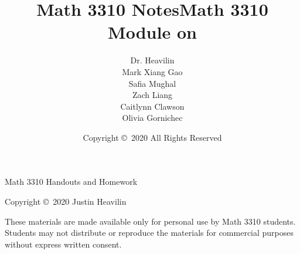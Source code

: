 \documentclass[10pt,twoside,reqno]{book}
\title{Math 3310 Notes}
\author{Dr. Heavilin\\Mark Xiang Gao\\Safia Mughal\\Zach Liang\\Caitlynn Clawson\\Olivia Gornichec\\}
\date{Copyright \copyright\ 2020  All Rights Reserved}
\title{Math 3310\\  Module on
\ifone{Sets~}\fi
\iftwo{Induction~}\fi
\ifthree{Finite Differences~}\fi
\iffour{Logic~}\fi
\iffive{Recursion~}\fi
\ifsix{Graph Theory~}\fi
\ifseven{Number Theory~}\fi
\ifeight{Groups~}\fi
\ifeight{Generating Functions~}\fi
\ifeight{10~}\fi
}
\theoremstyle{exampstyle} \newtheorem{mytheorem}[theorem]{Theorem}
\theoremstyle{exampstyle} \newtheorem{example}[theorem]{Example}
\theoremstyle{exampstyle} \newtheorem{remark}[theorem]{Remark}
\theoremstyle{exampstyle} \newtheorem{definition}[theorem]{Definition}
\theoremstyle{exampstyle} \newtheorem{lemma}[theorem]{Lemma}
\theoremstyle{exampstyle} \newtheorem{corollary}[theorem]{Corollary}
\theoremstyle{exampstyle} \newtheorem{geometric}[theorem]{Geometrically}
\theoremstyle{exampstyle} \newtheorem{idea}[theorem]{Idea}
\theoremstyle{exampstyle} \newtheorem{exercise}[section]{Exercise}
\theoremstyle{exampstyle} \newtheorem{extracredit}[subsection]{Extra Credit}
\theoremstyle{exampstyle} \newtheorem{axiom}[theorem]{Axiom}
\theoremstyle{problem} \newtheorem{problem}{Problem}[section]
\begin{document}
\newif\ifone
\newif\iftwo
\newif\ifthree
\newif\iffour
\newif\iffive
\newif\ifsix
\newif\ifseven
\newif\ifeight
\newif\ifnine
\newif\iften
\onetrue %

\maketitle
\renewcommand*\thesection{M\arabic{section}}
\thispagestyle{empty}
Math 3310 Handouts and Homework
\vfill
\begin{minipage}[b]{0.9\textwidth}
\footnotesize\raggedright
\setlength{\parskip}{0.5\baselineskip}
Copyright \copyright \ 2020 Justin Heavilin\par
These materials are made available only for personal use by Math 3310 students.   Students may not distribute or reproduce the materials for commercial purposes without express written consent. 
\end{minipage}
\vspace*{2\baselineskip}


%
\end{document}
